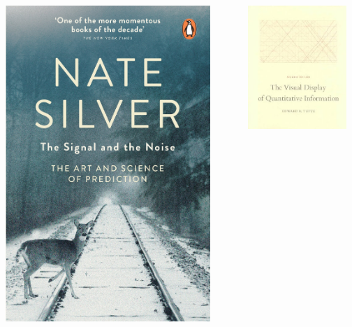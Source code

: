 \documentclass[handout]{beamer}
\begin{document}
\begin{frame}
\begin{columns}
\begin{column}{0.3\textwidth}
			\includegraphics[width=0.9\textwidth]{../figures/signal_noise.jpeg}
		\end{column}
		\begin{column}{0.3\textwidth}
			\includegraphics[width=0.9\textwidth]{../figures/tufte.jpeg}

\end{column}
\end{columns}
\end{frame}
\end{document}
